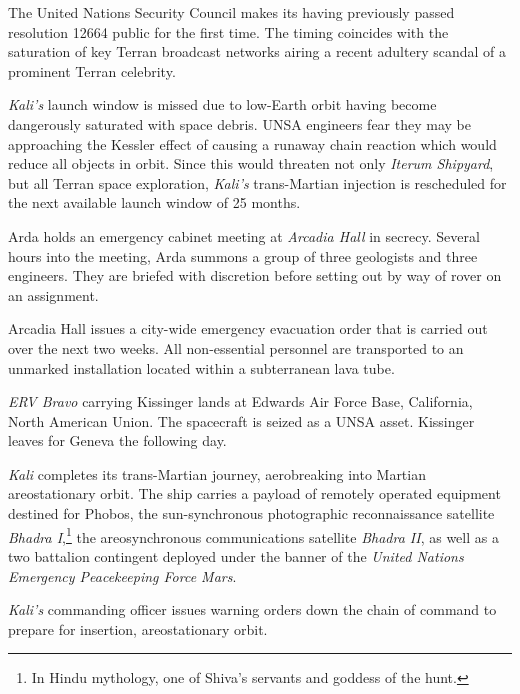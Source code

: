 The United Nations Security Council makes its having previously passed resolution 12664 public for the first time. The timing coincides with the saturation of key Terran broadcast networks airing a recent adultery scandal of a prominent Terran celebrity.
\StopTimelineDate

{\it Kali's} launch window is missed due to low-Earth orbit having become dangerously saturated with space debris. UNSA engineers fear they may be approaching the Kessler effect of causing a runaway chain reaction which would reduce all objects in orbit. Since this would threaten not only {\it Iterum Shipyard}, but all Terran space exploration, {\it Kali's} trans-Martian injection is rescheduled for the next available launch window of 25 months.
\StopTimelineDate

Arda holds an emergency cabinet meeting at {\it Arcadia Hall} in secrecy. Several hours into the meeting, Arda summons a group of three geologists and three engineers. They are briefed with discretion before setting out by way of rover on an assignment.
\StopTimelineDate

Arcadia Hall issues a city-wide emergency evacuation order that is carried out over the next two weeks. All non-essential personnel are transported to an unmarked installation located within a subterranean lava tube.
\StopTimelineDate

{\it ERV Bravo} carrying Kissinger lands at Edwards Air Force Base, California, North American Union. The spacecraft is seized as a UNSA asset. Kissinger leaves for Geneva the following day.
\StopTimelineDate

{\it Kali} completes its trans-Martian journey, aerobreaking into Martian areostationary orbit. The ship carries a payload of remotely operated equipment destined for Phobos, the sun-synchronous photographic reconnaissance satellite {\it Bhadra I},\footnote{In Hindu mythology, one of Shiva's servants and goddess of the hunt.} the areosynchronous communications satellite {\it Bhadra II}, as well as a two battalion contingent deployed under the banner of the {\it United Nations Emergency Peacekeeping Force Mars}.
\StopTimelineDate

{\it Kali's} commanding officer issues warning orders down the chain of command to prepare for insertion, areostationary orbit.
\StopTimelineDate

